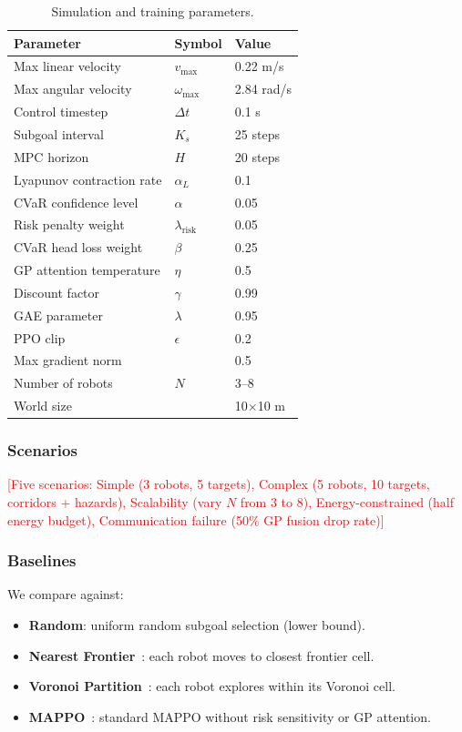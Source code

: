 \documentclass[letterpaper]{IEEEtran}
\newcommand{\lrisk}{\lambda_{\text{risk}}}
\begin{document}
\begin{table}[t]
\caption{Simulation and training parameters.}
\label{tab:params}
\centering\small
\begin{tabular}{lll}
\toprule
Parameter & Symbol & Value \\
\midrule
Max linear velocity & $v_{\max}$ & 0.22 m/s \\
Max angular velocity & $\omega_{\max}$ & 2.84 rad/s \\
Control timestep & $\Delta t$ & 0.1 s \\
Subgoal interval & $K_s$ & 25 steps \\
MPC horizon & $H$ & 20 steps \\
Lyapunov contraction rate & $\alpha_L$ & 0.1 \\
CVaR confidence level & $\alpha$ & 0.05 \\
Risk penalty weight & $\lrisk$ & 0.05 \\
CVaR head loss weight & $\beta$ & 0.25 \\
GP attention temperature & $\eta$ & 0.5 \\
Discount factor & $\gamma$ & 0.99 \\
GAE parameter & $\lambda$ & 0.95 \\
PPO clip & $\epsilon$ & 0.2 \\
Max gradient norm & & 0.5 \\
Number of robots & $N$ & 3--8 \\
World size & & 10$\times$10 m \\
\bottomrule
\end{tabular}
\end{table}

\subsubsection{Scenarios}
\textcolor{red}{[Five scenarios: Simple (3 robots, 5 targets), Complex (5 robots, 10 targets, corridors + hazards), Scalability (vary $N$ from 3 to 8), Energy-constrained (half energy budget), Communication failure (50\% GP fusion drop rate)]}

\subsubsection{Baselines}
We compare against:
\begin{itemize}
    \item \textbf{Random}: uniform random subgoal selection (lower bound).
    \item \textbf{Nearest Frontier}~\cite{yamauchi1997frontier}: each robot moves to closest frontier cell.
    \item \textbf{Voronoi Partition}~\cite{breitenmoser2010voronoi}: each robot explores within its Voronoi cell.
    \item \textbf{MAPPO}~\cite{yu2022surprising}: standard MAPPO without risk sensitivity or GP attention.
\end{itemize}
\end{document}
